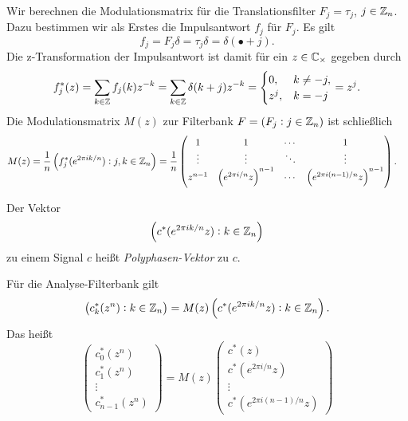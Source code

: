 \begin{example}
Wir berechnen die Modulationsmatrix für die Translationsfilter $ F_{j} = \tau_{j} $,
$ j \in \mathbb{Z}_{n} $. Dazu bestimmen wir als Erstes die Impulsantwort $ f_{j} $ für $ F_{j} $. Es gilt
\[
  f_{j} = F_{j}\delta = \tau_{j}\delta = \delta(\bullet + j).
\]
Die z-Transformation der Impulsantwort ist damit für ein $ z \in \mathbb{C}_{\times} $ gegeben durch
\[
    f_{j}^{*}(z)
  = \sum_{k \in \mathbb{Z}} f_{j}(k) z^{-k}
  = \sum_{k \in \mathbb{Z}} \delta(k + j) z^{-k}
  = \begin{cases}
      0, & k \neq -j, \\
      z^{j}, & k = -j
    \end{cases}
  = z^{j}.
\]
Die Modulationsmatrix $ M(z) $ zur Filterbank $ F = (F_{j} : j \in \mathbb{Z}_{n}) $ ist schließlich
\begin{align*}
   M(z)
&= \frac{1}{n} \left( f_{j}^{*}(e^{2\pi ik/n}) : j,k \in \mathbb{Z}_{n} \right) 
 = \frac{1}{n} \begin{pmatrix}
     1 & 1 & \cdots & 1 \\
     \vdots & \vdots & \ddots & \vdots \\
     z^{n-1} & \left( e^{2\pi i/n}z \right)^{n-1} & \cdots & \left( e^{2\pi i(n-1)/n}z \right)^{n-1}
   \end{pmatrix}.
\end{align*}
\end{example}

\begin{definition}
Der Vektor
\[
  \left( c^{*}(e^{2\pi ik/n}z) : k \in \mathbb{Z}_{n} \right)
\]
zu einem Signal $ c $ heißt \emph{Polyphasen-Vektor} zu $ c $.
\end{definition}

\begin{proposition}
Für die Analyse-Filterbank gilt
\[
    \left( c^{*}_{k}(z^{n}) : k \in \mathbb{Z}_{n} \right)
  = M(z) \left( c^{*}(e^{2\pi ik/n}z) : k \in \mathbb{Z}_{n} \right).
\]
Das heißt
\[
    \begin{pmatrix}
      c_{0}^{*}(z^{n}) \\
      c_{1}^{*}(z^{n}) \\
      \vdots \\
      c_{n-1}^{*}(z^{n})
    \end{pmatrix}
  = M(z) \begin{pmatrix}
      c^{*}(z) \\
      c^{*}(e^{2\pi i/n}z) \\
      \vdots \\
      c^{*}(e^{2\pi i(n-1)/n}z)
    \end{pmatrix}
\]
\end{proposition}

